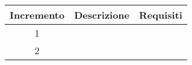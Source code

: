 \begin{center}
	\renewcommand{\arraystretch}{1.8} %
	\begin{tabular}{ |c|m{12em}|m{7em}| }
	\hline
	\textbf{Incremento} & \textbf{Descrizione} &  \textbf{Requisiti} \\ %
	\hline 
    1 & & \\
    \hline
    2 & & \\

    \hline
	\end{tabular}
\end{center}
\newpage